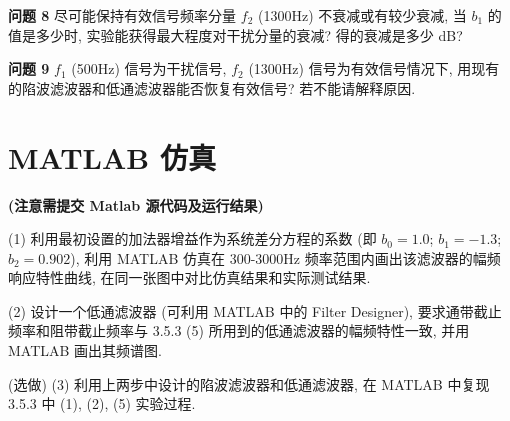 \documentclass{dspreport}
\begin{document}
\begin{block}

\end{block}

\textbf{问题 8} 尽可能保持有效信号频率分量 $f_2$ (1300Hz) 不衰减或有较少衰减, 当 $b_1$ 的值是多少时, 实验能获得最大程度对干扰分量的衰减? 得的衰减是多少 dB?
\begin{block}

\end{block}

\textbf{问题 9} $f_1$ (500Hz) 信号为干扰信号, $f_2$ (1300Hz) 信号为有效信号情况下, 用现有的陷波滤波器和低通滤波器能否恢复有效信号? 若不能请解释原因.
\begin{block}

\end{block}

\section{MATLAB 仿真}
\textbf{(注意需提交 Matlab 源代码及运行结果)}

(1) 利用最初设置的加法器增益作为系统差分方程的系数 (即 $b_0=1.0$; $b_1=-1.3$; $b_2=0.902$), 利用 MATLAB 仿真在 300-3000Hz 频率范围内画出该滤波器的幅频响应特性曲线, 在同一张图中对比仿真结果和实际测试结果.
\begin{block}

\end{block}

\begin{figure}[H]
    \centering
\end{figure}

\begin{block}

\end{block}

(2) 设计一个低通滤波器 (可利用 MATLAB 中的 Filter Designer), 要求通带截止频率和阻带截止频率与 3.5.3 (5) 所用到的低通滤波器的幅频特性一致, 并用 MATLAB 画出其频谱图.
\begin{block}

\end{block}

\begin{figure}[H]
    \centering
\end{figure}

\begin{block}

\end{block}

(选做) (3) 利用上两步中设计的陷波滤波器和低通滤波器, 在 MATLAB 中复现 3.5.3 中 (1), (2), (5) 实验过程.
\end{document}
